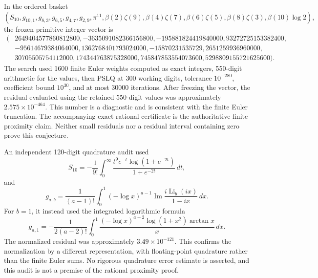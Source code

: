 \documentclass[11pt,letterpaper]{article}
\theoremstyle{definition}
\theoremstyle{remark}
\begin{document}
In the ordered basket
\[
 (S_{10},g_{10,1},g_{8,3},g_{6,5},g_{4,7},g_{2,9},\pi^{11},
 \beta(2)\zeta(9),\beta(4)\zeta(7),\beta(6)\zeta(5),
 \beta(8)\zeta(3),\beta(10)\log2),
\]
the frozen primitive integer vector is
\[
\begin{split}
 (&2649404577860812800,-3635091082366156800,
 -195881824419840000,93272725153382400,\\
 &-95614679384064000,1362768401793024000,-15870231535729,
 2651259936960000,\\
 &30705505754112000,174344763875328000,
 745847853554073600,5298809155721625600).
\end{split}
\]
The search used 1600 finite Euler weights computed as exact integers,
550-digit arithmetic for the values, then PSLQ at 300 working digits,
tolerance $10^{-280}$, coefficient bound $10^{30}$, and at most 30000
iterations.  After freezing the vector, the residual evaluated using the
retained 550-digit values was approximately $2.575\times10^{-464}$.
This number is a diagnostic and is consistent with the finite Euler
truncation.  The accompanying exact rational certificate is the
authoritative finite proximity claim.  Neither small residuals nor a
residual interval containing zero prove this conjecture.

An independent 120-digit quadrature audit used
\[
 S_{10}=-\frac1{9!}\int_0^\infty
 \frac{t^9e^{-t}\log(1+e^{-2t})}{1+e^{-2t}}\,dt,
\]
and
\[
 g_{a,b}=\frac1{(a-1)!}\int_0^1(-\log x)^{a-1}
 \operatorname{Im}\frac{i\operatorname{Li}_b(ix)}{1-ix}\,dx.
\]
For $b=1$, it instead used the integrated logarithmic formula
\[
 g_{a,1}=-\frac1{2(a-2)!}\int_0^1
 \frac{(-\log x)^{a-2}\log(1+x^2)\arctan x}{x}\,dx.
\]
The normalized residual was approximately $3.49\times10^{-121}$.
This confirms the normalization by a different representation, with
floating-point quadrature rather than the finite Euler sums.  No
rigorous quadrature error estimate is asserted, and this audit is not
a premise of the rational proximity proof.
\end{document}
